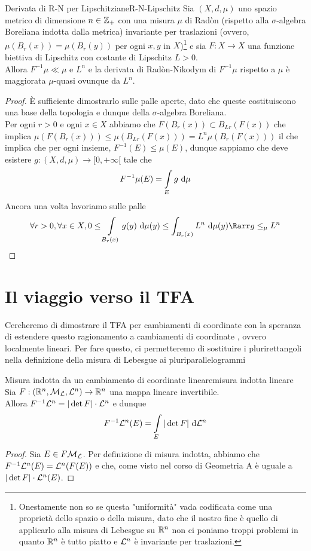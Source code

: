 \documentclass{article}
\begin{document}
\begin{proposition}{Derivata di R-N per Lipschitziane}{R-N-Lipschitz}
    Sia $(X,d,\mu)$ uno spazio metrico di dimensione $n \in \mathbb{Z}_+$ con una misura $\mu$ di Radòn (rispetto alla $\sigma$-algebra Boreliana indotta dalla metrica) invariante per traslazioni (ovvero, $\mu(B_r(x)) = \mu(B_r(y))$ per ogni $x,y$ in $X$)\footnote{Onestamente non so se questa "uniformità" vada codificata come una proprietà dello spazio o della misura, dato che il nostro fine è quello di applicarlo alla misura di Lebesgue su $\mathbb{R}^n$ non ci poniamo troppi problemi in quanto $\mathbb{R}^n$ è tutto piatto e $\mathcal{L}^n$ è invariante per traslazioni.} e sia $F:X \to X$ una funzione biettiva di Lipschitz con costante di Lipschitz $L>0$.\\
    Allora $F^{-1}\mu \ll \mu$ e $L^n$ e la derivata di Radòn-Nikodym di $F^{-1}\mu$ rispetto a $\mu$ è maggiorata $\mu$-quasi ovunque da $L^n$.
    \begin{proof}
        È sufficiente dimostrarlo sulle palle aperte, dato che queste costituiscono una base della topologia e dunque della $\sigma$-algebra Boreliana.\\
        Per ogni $r>0$ e ogni $x \in X$ abbiamo che  $F(B_r(x)) \subset B_{Lr}(F(x))$ che implica $\mu(F(B_r(x)))\le \mu(B_{Lr}(F(x))) = L^n\mu(B_r(F(x)))$ il che implica che per ogni insieme, $F^{-1}(E) \le \mu(E)$, dunque sappiamo che deve esistere $g: (X,d,\mu)\to [0,+\infty[$ tale che
        \[F^{-1}\mu(E) = \int\limits_E g \text{ d} \mu\]
        Ancora una volta lavoriamo sulle palle
        \[\forall r>0,\forall x \in X, 0\le \int\limits_{B_r(x)} g(y)\de \mu(y) \le \int_{B_r(x)} L^n \de\mu(y) \Rarr g \le_\mu L^n \]
    \end{proof}
\end{proposition}

\section{Il viaggio verso il TFA}

Cercheremo di dimostrare il TFA per cambiamenti di coordinate  con la speranza di estendere questo ragionamento a cambiamenti di coordinate , ovvero localmente lineari. Per fare questo, ci permetteremo di sostituire i plurirettangoli nella definizione della misura di Lebesgue ai pluriparallelogrammi

\begin{lemma}{Misura indotta da un cambiamento di coordinate lineare}{misura indotta lineare}
    Sia $F: (\mathbb{R}^n, \mathcal{M}_{\mathcal{L}}, \mathcal{L}^n) \to \mathbb{R}^n$ una mappa lineare invertibile.\\
    Allora $F^{-1}\mathcal{L}^n = |\det F|\cdot \mathcal{L}^n$ e dunque
    \[F^{-1}\mathcal{L}^n(E) = \int\limits_E |\det F|\text{ d} \mathcal{L}^n\]
    \begin{proof}
        Sia $E \in F\mathcal{M}_{\mathcal{L}}$. Per definizione di misura indotta, abbiamo che $F^{-1}\mathcal{L}^n(E) = \mathcal{L}^n(F(E))$ e che, come visto nel corso di Geometria A è uguale a $|\det F|\cdot \mathcal{L}^n(E)$.
    \end{proof}
\end{lemma}
\end{document}
